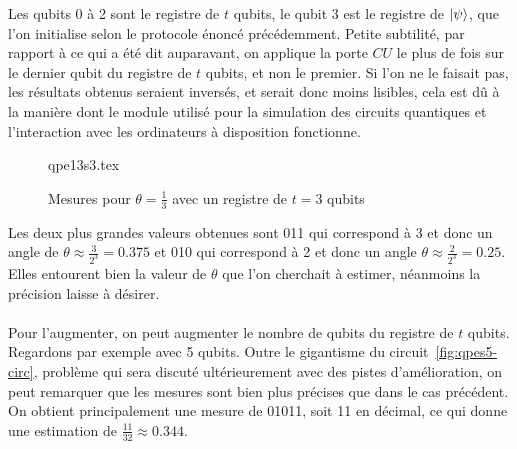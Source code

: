Les qubits 0 à 2 sont le registre de $t$ qubits, le qubit 3 est le registre de $\ket{\psi}$,
que l'on initialise selon le protocole énoncé précédemment.
Petite subtilité, par rapport à ce qui a été dit auparavant, on applique la porte $CU$
le plus de fois sur le dernier qubit du registre de $t$ qubits, et non le premier.
Si l'on ne le faisait pas, les résultats obtenus seraient inversés, et serait donc moins
lisibles, cela est dû à la manière dont le module utilisé pour la simulation des circuits
quantiques et l'interaction avec les ordinateurs à disposition fonctionne.
\begin{figure}[H]
    \centering
    {qpe13s3.tex}
    \caption{Mesures pour $\theta = \frac{1}{3}$ avec un registre de $t = 3$ qubits}
    \label{fig:qpes3-meas}
\end{figure}
Les deux plus grandes valeurs obtenues sont 011 qui correspond à 3 et donc un angle
de $\theta \approx \frac{3}{2^3} = 0.375$ et 010 qui correspond à 2 et donc un angle
$\theta \approx \frac{2}{2^3} = 0.25$.
Elles entourent bien la valeur de $\theta$ que l'on cherchait à estimer, néanmoins
la précision laisse à désirer.\\ \\
Pour l'augmenter, on peut augmenter le nombre de qubits du registre de $t$ qubits.
Regardons par exemple avec 5 qubits.
Outre le gigantisme du circuit~\ref{fig:qpes5-circ}, problème qui sera discuté ultérieurement
avec des pistes d'amélioration, on peut remarquer que les mesures sont bien plus précises
que dans le cas précédent.
On obtient principalement une mesure de 01011, soit 11 en décimal, ce qui donne une estimation
de $\frac{11}{32} \approx 0.344$.
